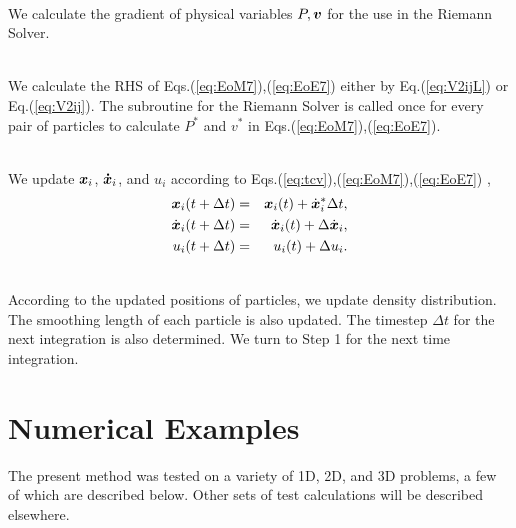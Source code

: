 \documentclass{cjour}
\newcommand{ \Vec   }[1]{ \mbox{\boldmath $ #1 $} }
\begin{document}
\begin{article}
 \\
\hspace*{0.5cm} 
We calculate the gradient of physical variables $P, \Vec{v}$ 
for the use in the Riemann Solver. 

 \\
\hspace*{0.5cm} 
We calculate the RHS of Eqs.(\ref{eq:EoM7}),(\ref{eq:EoE7}) 
either by Eq.(\ref{eq:V2ijL}) or Eq.(\ref{eq:V2ij}). 
The subroutine for the Riemann Solver is called once for every pair of 
particles to calculate $P^*$ and $v^*$ 
in Eqs.(\ref{eq:EoM7}),(\ref{eq:EoE7}).  
%
%

 \\
\hspace*{0.5cm} 
We update $\Vec{x}_i$, $\Vec{\dot{x}}_i$, and $u_i$ according to  
Eqs.(\ref{eq:tcv}),(\ref{eq:EoM7}),(\ref{eq:EoE7}) ,   
\begin{eqnarray}
                     \Vec{x}_i (t+\Delta t)  
          & = &      \Vec{x}_i (t)           +       \dot{\Vec{x}}_i^* 
                                                     \Delta t , 
                                                          \nonumber \\ 
                \dot{\Vec{x}}_i(t+\Delta t)  
          & = & \dot{\Vec{x}}_i(t)          + \Delta \dot{\Vec{x}}_i , 
                                                          \nonumber \\ 
                          u_i  (t+\Delta t)  
          & = &           u_i  (t)          + \Delta           u_i . 
                                                      \label{eq:Update}
\end{eqnarray}

 \\
\hspace*{0.5cm} 
According to the updated positions of particles, 
we update density distribution.  
The smoothing length of each particle is also updated.  
The timestep $\Delta t$ for the next integration is also determined. 
We turn to Step 1 for the next time integration. 

\section{Numerical Examples}
                                                  \label{sec:example}
The present method was tested on a variety of 1D, 2D, and 3D problems, 
a few of which are described below. 
Other sets of test calculations will be described elsewhere. 



\end{article}
\end{document}
